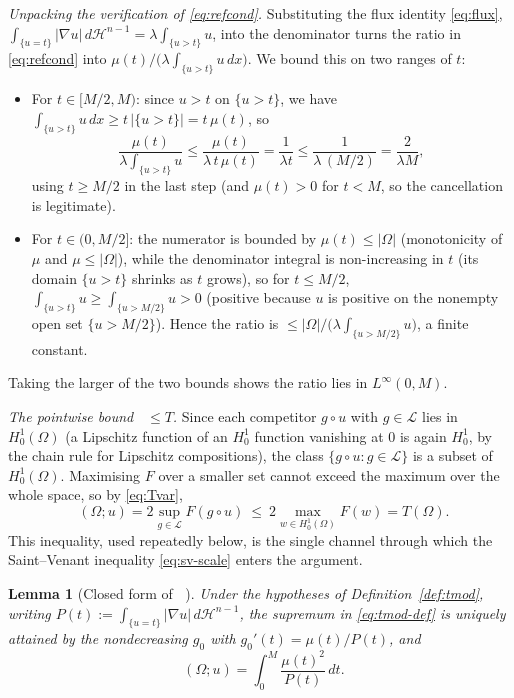\documentclass[11pt]{amsart}
\newtheorem{lemma}[theorem]{Lemma}
\theoremstyle{definition}
\newcommand{\Om}{\Omega}
\newcommand{\abs}[1]{\left|#1\right|}
\newcommand{\dx}{\,dx}
\newcommand{\dt}{\,dt}
\newcommand{\dH}{\,d\mathcal H^{n-1}}
\DeclareMathOperator{\Tmod}{T_{\mathrm{mod}}}
\begin{document}
\emph{Unpacking the verification of \eqref{eq:refcond}.} Substituting the
flux identity \eqref{eq:flux}, $\int_{\{u=t\}}\abs{\nabla u}\dH
=\lambda\int_{\{u>t\}}u$, into the denominator turns the ratio in
\eqref{eq:refcond} into $\mu(t)/\bigl(\lambda\int_{\{u>t\}}u\dx\bigr)$. We
bound this on two ranges of $t$:
\begin{itemize}
\item For $t\in[M/2,M)$: since $u>t$ on $\{u>t\}$, we have
$\int_{\{u>t\}}u\dx\ge t\,\abs{\{u>t\}}=t\,\mu(t)$, so
\[
  \frac{\mu(t)}{\lambda\int_{\{u>t\}}u}
  \le\frac{\mu(t)}{\lambda\, t\,\mu(t)}=\frac{1}{\lambda t}
  \le\frac{1}{\lambda\,(M/2)}=\frac{2}{\lambda M},
\]
using $t\ge M/2$ in the last step (and $\mu(t)>0$ for $t<M$, so the
cancellation is legitimate).
\item For $t\in(0,M/2]$: the numerator is bounded by $\mu(t)\le\abs\Om$
(monotonicity of $\mu$ and $\mu\le\abs\Om$), while the denominator integral
is non-increasing in $t$ (its domain $\{u>t\}$ shrinks as $t$ grows), so for
$t\le M/2$, $\int_{\{u>t\}}u\ge\int_{\{u>M/2\}}u>0$ (positive because $u$ is
positive on the nonempty open set $\{u>M/2\}$). Hence the ratio is
$\le\abs\Om/\bigl(\lambda\int_{\{u>M/2\}}u\bigr)$, a finite constant.
\end{itemize}
Taking the larger of the two bounds shows the ratio lies in $L^\infty(0,M)$.

\emph{The pointwise bound $\Tmod\le T$.} Since each competitor $g\circ u$
with $g\in\mathcal L$ lies in $H^1_0(\Om)$ (a Lipschitz function of an
$H^1_0$ function vanishing at $0$ is again $H^1_0$, by the chain rule for
Lipschitz compositions), the class $\{g\circ u:g\in\mathcal L\}$ is a subset
of $H^1_0(\Om)$. Maximising $F$ over a smaller set cannot exceed the maximum
over the whole space, so by \eqref{eq:Tvar},
\begin{equation}\label{eq:tmod-le-t}
  \Tmod(\Om;u)=2\sup_{g\in\mathcal L}F(g\circ u)
  \ \le\ 2\max_{w\in H^1_0(\Om)}F(w)=T(\Om).
\end{equation}
This inequality, used repeatedly below, is the single channel through which
the Saint--Venant inequality \eqref{eq:sv-scale} enters the argument.

\begin{lemma}[Closed form of $\Tmod$]\label{lem:tmod-formula}
Under the hypotheses of Definition~\ref{def:tmod}, writing
$P(t):=\int_{\{u=t\}}\abs{\nabla u}\dH$, the supremum in
\eqref{eq:tmod-def} is uniquely attained by the nondecreasing $g_0$ with
$g_0'(t)=\mu(t)/P(t)$, and
\begin{equation}\label{eq:tmod-formula}
  \Tmod(\Om;u)=\int_0^M\frac{\mu(t)^2}{P(t)}\dt .
\end{equation}
\end{lemma}
\end{document}
